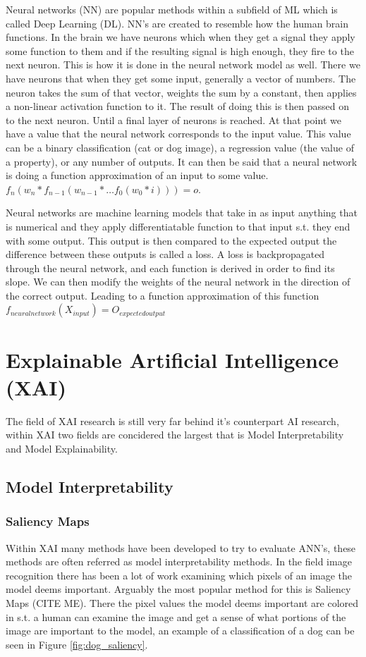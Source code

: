 Neural networks (NN) are popular methods within a subfield of ML which is called Deep Learning (DL). 
NN's are created to resemble how the human brain functions. In the brain we have neurons which 
when they get a signal they apply some function to them and if the resulting signal is high 
enough, they fire to the next neuron. This is how it is done in the neural network model as well.
There we have neurons that when they get some input, generally a vector of numbers. The neuron 
takes the sum of that vector, weights the sum by a constant, then applies a non-linear activation 
function to it. The result of doing this is then passed on to the next neuron. Until a final layer 
of neurons is reached. At that point we have a value that the neural network corresponds to the 
input value. This value can be a binary classification (cat or dog image), a regression value (the 
value of a property), or any number of outputs. It can then be said that a neural network is doing 
a function approximation of an input to some value. $f_n ( w_n * f_{n-1} (w_{n-1} * \dots f_0(w_0*i))) = o$. 

Neural networks are machine learning models that take in as input anything that is numerical 
and they apply differentiatable function to that input s.t. they end with some output. This 
output is then compared to the expected output the difference between these outputs is called 
a loss. A loss is backpropagated through the neural network, and each function is derived in 
order to find its slope. We can then modify the weights of the neural network in the direction 
of the correct output. Leading to a function approximation of this function
$f_{neuralnetwork}(X_{input}) = O_{expectedoutput}$

\section{Explainable Artificial Intelligence (XAI)}

The field of XAI research is still very far behind it's counterpart AI research,
within XAI two fields are concidered the largest that is Model Interpretability
and Model Explainability.

\subsection{Model Interpretability}


\subsubsection{Saliency Maps}
Within XAI many methods have been developed to try to evaluate
ANN's, these methods are often referred as model interpretability methods.
In the field image recognition there has been a lot of work examining which
pixels of an image the model deems important. Arguably the most popular
method for this is Saliency Maps (CITE ME). There the pixel values the model
deems important are colored in s.t. a human can examine the image and get a
sense of what portions of the image are important to the model, an example of
a classification of a dog can be seen in Figure \ref{fig:dog_saliency}.

